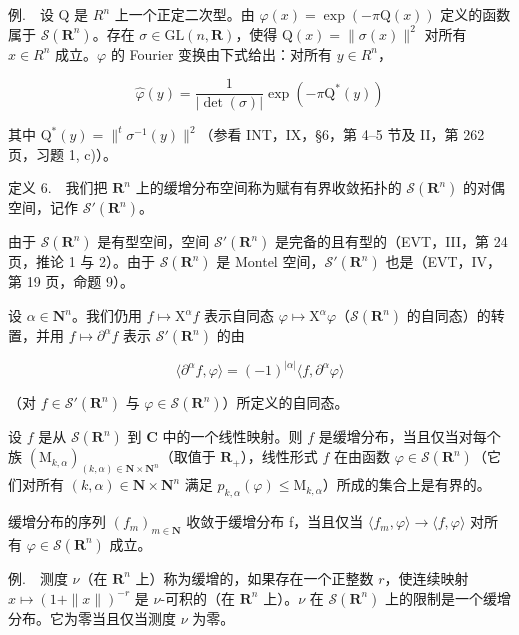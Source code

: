 例.　设 Q 是 \(R^{n}\) 上一个正定二次型。由 \(\varphi(x)=\exp(-\pi\mathrm{Q}(x))\) 定义的函数属于 \(\mathcal{S}(\mathbf{R}^{n})\)。存在 \(\sigma\in\mathrm{GL}(n,\mathbf{R})\)，使得 \(\mathrm{Q}(x)=\|\sigma(x)\|^{2}\) 对所有 \(x\in R^{n}\) 成立。\(\varphi\) 的 Fourier 变换由下式给出：对所有 \(y\in R^{n}\)，

\[
\widehat {\varphi} (y) = \frac {1}{| \det (\sigma) |} \exp (- \pi \mathrm{Q} ^ {*} (y))
\]

其中 \(\mathrm{Q}^{*}(y)=\|^{t}\sigma^{-1}(y)\|^{2}\)（参看 INT，IX，§6，第 4–5 节及 II，第 262 页，习题 1, c)）。

定义 6.　我们把 \(\mathbf{R}^{n}\) 上的缓增分布空间称为赋有有界收敛拓扑的 \(\mathcal{S}(\mathbf{R}^{n})\) 的对偶空间，记作 \(\mathcal{S}'(\mathbf{R}^{n})\)。

由于 \(\mathcal{S}(\mathbf{R}^n)\) 是有型空间，空间 \(\mathcal{S}'(\mathbf{R}^n)\) 是完备的且有型的（EVT，III，第 24 页，推论 1 与 2）。由于 \(\mathcal{S}(\mathbf{R}^n)\) 是 Montel 空间，\(\mathcal{S}'(\mathbf{R}^n)\) 也是（EVT，IV，第 19 页，命题 9）。

设 \(\alpha\in\mathbf{N}^{n}\)。我们仍用 \(f\mapsto\mathrm{X}^{\alpha}f\) 表示自同态 \(\varphi\mapsto\mathrm{X}^{\alpha}\varphi\)（\(\mathcal{S}(\mathbf{R}^{n})\) 的自同态）的转置，并用 \(f\mapsto\partial^{\alpha}f\) 表示 \(\mathcal{S}'(\mathbf{R}^{n})\) 的由

\[
\langle \partial^ {\alpha} f, \varphi \rangle = (- 1) ^ {| \alpha |} \langle f, \partial^ {\alpha} \varphi \rangle
\]

（对 \(f\in \mathcal{S}'(\mathbf{R}^n)\) 与 \(\varphi \in \mathcal{S}(\mathbf{R}^n)\)）所定义的自同态。

设 \(f\) 是从 \(\mathcal{S}(\mathbf{R}^{n})\) 到 \(\mathbf{C}\) 中的一个线性映射。则 \(f\) 是缓增分布，当且仅当对每个族 \((\mathrm{M}_{k,\alpha})_{(k,\alpha)\in\mathbf{N}\times\mathbf{N}^{n}}\)（取值于 \(\mathbf{R}_{+}\)），线性形式 \(f\) 在由函数 \(\varphi\in\mathcal{S}(\mathbf{R}^{n})\)（它们对所有 \((k,\alpha)\in\mathbf{N}\times\mathbf{N}^{n}\) 满足 \(p_{k,\alpha}(\varphi)\leqslant\mathrm{M}_{k,\alpha}\)）所成的集合上是有界的。

缓增分布的序列 \((f_{m})_{m\in\mathbf{N}}\) 收敛于缓增分布 f，当且仅当 \(\langle f_{m},\varphi\rangle\to\langle f,\varphi\rangle\) 对所有 \(\varphi\in\mathcal{S}(\mathbf{R}^{n})\) 成立。

例.　测度 \(\nu\)（在 \(\mathbf{R}^n\) 上）称为缓增的，如果存在一个正整数 \(r\)，使连续映射 \(x \mapsto (1 + \|x\|)^{-r}\) 是 \(\nu\)-可积的（在 \(\mathbf{R}^n\) 上）。\(\nu\) 在 \(\mathcal{S}(\mathbf{R}^n)\) 上的限制是一个缓增分布。它为零当且仅当测度 \(\nu\) 为零。

